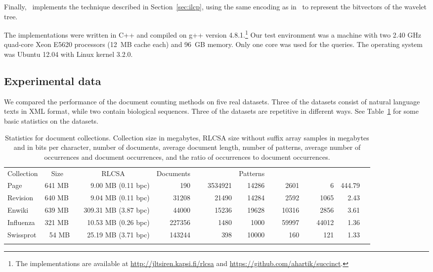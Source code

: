 \documentclass[11pt]{llncs}
\newcommand{\Enwiki}{\textsf{Enwiki}}
\newcommand{\Page}{\textsf{Page}}
\newcommand{\Revision}{\textsf{Revision}}
\newcommand{\Influenza}{\textsf{Influenza}}
\newcommand{\Swissprot}{\textsf{Swissprot}}
\begin{document}
Finally, \wt\ implements the technique described in Section~\ref{sec:ilcp}, 
using the same encoding as in \sadaR\ to represent the bitvectors of the wavelet tree.

The implementations were written in C++ and compiled on g++ version 4.8.1.\footnote{The implementations are available at \url{http://jltsiren.kapsi.fi/rlcsa} and \url{https://github.com/ahartik/succinct}.} Our test environment was a machine with two 2.40 GHz quad-core Xeon E5620 processors (12~MB cache each) and 96~GB memory. Only one core was used for the queries. The operating system was Ubuntu 12.04 with Linux kernel 3.2.0.

\subsection{Experimental data}\label{section:data}

We compared the performance of the document counting methods on five real datasets. Three of the datasets consist of natural language texts in XML format, while two contain biological sequences. Three of the datasets are repetitive in different ways. See Table~\ref{table:collections} for some basic statistics on the datasets.

\begin{table}[t]
\centering
\caption{Statistics for document collections. Collection size in megabytes, RLCSA size without suffix array samples in megabytes and in bits per character, number of documents, average document length, number of patterns, average number of occurrences and document occurrences, and the ratio of occurrences to document occurrences.}\label{table:collections}

\begin{tabular}{llrrrrrrrr}
\hline
\noalign{\smallskip}
Collection & \multicolumn{1}{c}{Size} & \multicolumn{1}{c}{RLCSA} & Documents &  & Patterns &  &  &  \\
\noalign{\smallskip}
\hline
\noalign{\smallskip}
\Page      & 641 MB &   9.00 MB (0.11 bpc) &    190 & ~~~3534921 & 14286 &  2601 &     6 & 444.79 \\
\Revision  & 640 MB &   9.04 MB (0.11 bpc) &  31208 &   21490 & 14284 &  2592 &  1065 &   2.43 \\
\Enwiki    & 639 MB & ~~309.31 MB (3.87 bpc) &  44000 &   15236 & 19628 & 10316 &  2856 &   3.61 \\
\Influenza & 321 MB &  10.53 MB (0.26 bpc) & 227356 &    1480 &  1000 & ~~~59997 & ~~~44012 &   1.36 \\
\Swissprot & ~\,54 MB &  25.19 MB (3.71 bpc) & 143244 &     398 & 10000 &   160 &   121 &   1.33 \\
\noalign{\smallskip}
\hline
\end{tabular}
\end{table}
\end{document}
